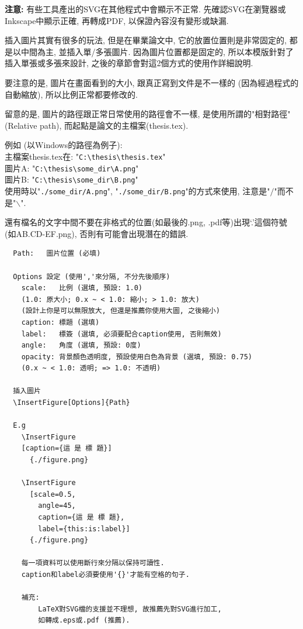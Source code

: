 \noindent \textbf{注意:} 有些工具產出的SVG在其他程式中會顯示不正常. 先確認SVG在瀏覽器或Inkscape中顯示正確, 再轉成PDF, 以保證內容沒有變形或缺漏.

\newpage
{}

插入圖片其實有很多的玩法, 但是在畢業論文中, 它的放置位置則是非常固定的, 都是以中間為主, 並插入單/多張圖片. 因為圖片位置都是固定的, 所以本模版針對了插入單張或多張來設計, 之後的章節會對這2個方式的使用作詳細說明.

要注意的是, 圖片在畫面看到的大小, 跟真正寫到文件是不一樣的 (因為經過程式的自動縮放), 所以比例正常都要修改的.

留意的是, 圖片的路徑跟正常日常使用的路徑會不一樣, 是使用所謂的"相對路徑" (Relative path), 而起點是論文的主檔案(thesis.tex).

\noindent 例如 (以Windows的路徑為例子):\\
主檔案thesis.tex在: "\verb|C:\thesis\thesis.tex|"\\
圖片A: "\verb|C:\thesis\some_dir\A.png|"\\
圖片B: "\verb|C:\thesis\some_dir\B.png|"\\
使用時以"\verb|./some_dir/A.png|", "\verb|./some_dir/B.png|"的方式來使用, 注意是"$/$"而不是"$\backslash$".

還有檔名的文字中間不要在非格式的位置(如最後的.png, .pdf等)出現`.'這個符號 (如AB.CD-EF.png), 否則有可能會出現潛在的錯誤.

\newpage
{}

  \begin{DescriptionFrame}
  \begin{verbatim}
  Path:   圖片位置 (必填)

  Options 設定 (使用','來分隔, 不分先後順序)
    scale:   比例 (選填, 預設: 1.0)
    (1.0: 原大小; 0.x ~ < 1.0: 縮小; > 1.0: 放大)
    (設計上你是可以無限放大, 但還是推薦你使用大圖, 之後縮小)
    caption: 標題 (選填)
    label:   標簽 (選填, 必須要配合caption使用, 否則無效)
    angle:   角度 (選填, 預設: 0度)
    opacity: 背景顏色透明度, 預設使用白色為背景 (選填, 預設: 0.75)
    (0.x ~ < 1.0: 透明; => 1.0: 不透明)

  插入圖片
  \InsertFigure[Options]{Path}

  E.g
    \InsertFigure
    [caption={這 是 標 題}]
      {./figure.png}

    \InsertFigure
      [scale=0.5,
        angle=45,
        caption={這 是 標 題},
        label={this:is:label}]
      {./figure.png}

    每一項資料可以使用斷行來分隔以保持可讀性.
    caption和label必須要使用'{}'才能有空格的句子.

    補充:
        LaTeX對SVG檔的支援並不理想, 故推薦先對SVG進行加工,
        如轉成.eps或.pdf (推薦).
  \end{verbatim}
  \end{DescriptionFrame}

